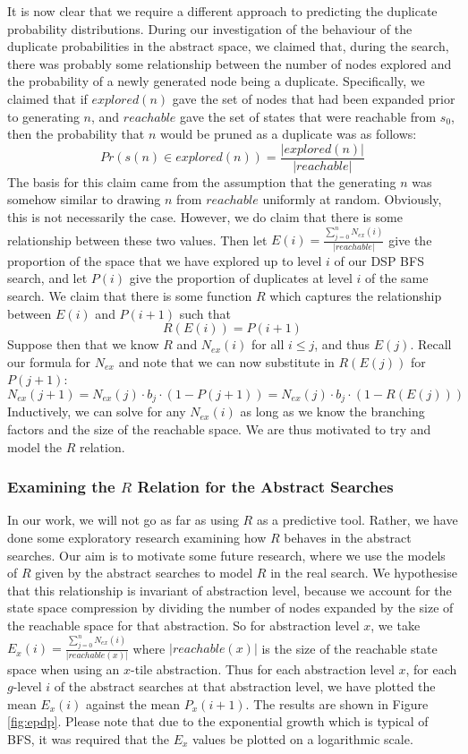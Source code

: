 \documentclass{article}
\begin{document}
It is now clear that we require a different approach to predicting the duplicate probability distributions.
During our investigation of the behaviour of the duplicate probabilities in the abstract space,
we claimed that, during the search, there was probably some relationship between the number of nodes explored and
the probability of a newly generated node being a duplicate. Specifically,
we claimed that if \(explored(n)\) gave the set of nodes that had been expanded prior to generating \(n\),
and \(reachable\) gave the set of states that were reachable from \(s_0\),
then the probability that \(n\) would be pruned as a duplicate was as follows:
\[Pr(s(n) \in explored(n)) = \frac{|explored(n)|}{|reachable|} \]
The basis for this claim came from the assumption that the generating \(n\)
was somehow similar to drawing \(n\) from \(reachable\) uniformly at random.
Obviously, this is not necessarily the case.
However, we do claim that there is some relationship between these two values.
Then let \(E(i) = \frac{\sum_{j = 0}^n N_{ex}(i)}{|reachable|}\) give the proportion of the space that we have explored up to level \(i\) of our DSP BFS search,
and let \(P(i)\) give the proportion of duplicates at level \(i\) of the same search.
We claim that there is some function \(R\) which captures the relationship between \(E(i)\) and \(P(i+1)\)
such that
\[R(E(i)) = P(i+1)\]
Suppose then that we know \(R\) and \(N_{ex}(i)\) for all \(i \leq j\),
and thus \(E(j)\). Recall our formula for \(N_{ex}\) and note that we can now substitute in \(R(E(j))\) for \(P(j+1)\):
\[N_{ex}(j+1) = N_{ex}(j) \cdot b_j \cdot (1 - P(j+1)) = N_{ex}(j) \cdot b_j \cdot (1 - R(E(j)))\]
Inductively, we can solve for any \(N_{ex}(i)\) as long as we know the branching factors and the size of the reachable space.
We are thus motivated to try and model the \(R\) relation.

\subsubsection*{Examining the \(R\) Relation for the Abstract Searches}

In our work, we will not go as far as using \(R\) as a predictive tool.
Rather, we have done some exploratory research examining how \(R\) behaves in the abstract searches.
Our aim is to motivate some future research, where we use the models of \(R\) given by the abstract searches
to model \(R\) in the real search. We hypothesise that this relationship is invariant of abstraction level,
because we account for the state space compression by dividing the number of nodes expanded by the size
of the reachable space for that abstraction. So for abstraction level \(x\),
we take \(E_x(i) = \frac{\sum_{j = 0}^n N_{ex}(i)}{|reachable(x)|}\) where \(|reachable(x)|\) is the size of the reachable state space
when using an \(x\)-tile abstraction.
Thus for each abstraction level \(x\), for each \(g\)-level \(i\) of the abstract searches at that abstraction level, we have plotted the mean \(E_x(i)\) against the mean \(P_x(i+1)\).
The results are shown in Figure \ref{fig:epdp}.
Please note that due to the exponential growth which is typical of BFS, it was required that the \(E_x\) values be plotted on a logarithmic scale. \\
\end{document}
